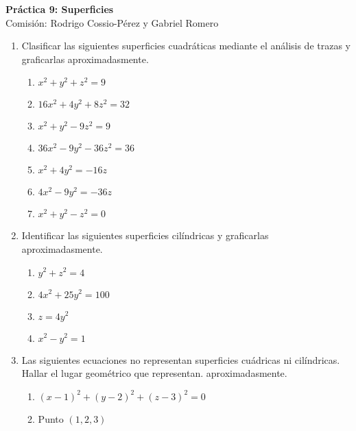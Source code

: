 \documentclass[a4paper]{article}
\newcommand{\answer}{\item[**]}
\newcommand{\exercise}{\item}
\begin{document}
\noindent \hrulefill 
\vspace{-7pt}
\begin{center} 
	\textbf{ Práctica 9: Superficies } \\
	Comisión: Rodrigo Cossio-Pérez y Gabriel Romero
\end{center}
\vspace{-10pt}
\hrulefill


\begin{enumerate}

	\exercise Clasificar las siguientes superficies cuadráticas mediante el análisis de trazas y graficarlas aproximadasmente.
	\begin{multicols}{2}
	\begin{enumerate} [label=(\alph*)]
		
		\item $x^2+y^2+z^2=9$
		\item $16x^2+4y^2+8z^2=32$
		\item $x^2+y^2-9z^2=9$
		\item $36x^2-9y^2-36z^2=36$
		\item $x^2+4y^2=-16z$
		\item $4x^2-9y^2=-36z$
		\item $x^2+y^2-z^2=0$

	\end{enumerate}
	\end{multicols}


	\exercise Identificar las siguientes superficies cilíndricas y graficarlas aproximadasmente.
	\begin{multicols}{2}
	\begin{enumerate} [label=(\alph*)]
		
		\item $y^2+z^2=4$
		\item $4x^2+25y^2=100$
		\item $z=4y^2$
		\item $x^2-y^2=1$

	\end{enumerate}
	\end{multicols}

	\exercise Las siguientes ecuaciones no representan superficies cuádricas ni cilíndricas. Hallar el lugar geométrico que representan. aproximadasmente.
	\begin{multicols}{2}
	\begin{enumerate} [label=(\alph*)]
		
		\item $(x-1)^2+(y-2)^2+(z-3)^2=0$
		\answer Punto $(1,2,3)$ 


\end{enumerate}
\end{multicols}
\end{enumerate}
\end{document}
